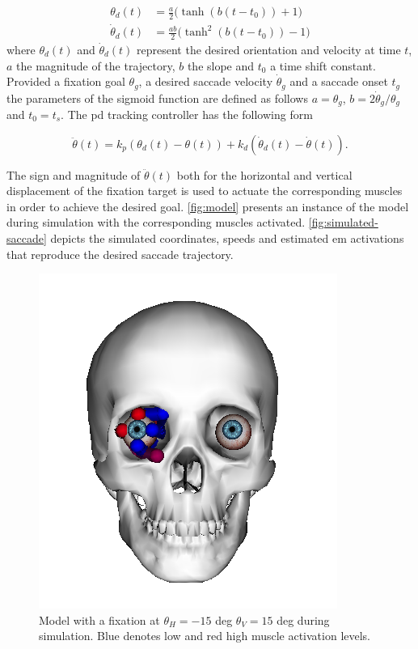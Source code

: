 \documentclass[11pt,a4paper,draft=false]{report}
\begin{document}
\begin{equation}\label{equ:sigmoid}
  \begin{aligned}
    \theta_d(t) &= \frac{a}{2} \Big(\tanh(b (t - t_0)) + 1\Big) \\
    \dot{\theta}_d(t) &= \frac{a b}{2} \Big(\tanh^2(b (t - t_0)) - 1\Big)
  \end{aligned}
\end{equation}
% 
where $\theta_d(t)$ and $\dot{\theta}_d(t)$ represent the desired orientation
and velocity at time $t$, $a$ the magnitude of the trajectory, $b$ the slope and
$t_0$ a time shift constant. Provided a fixation goal $\theta_g$, a desired
saccade velocity $\dot{\theta}_g$ and a saccade onset $t_g$ the parameters of
the sigmoid function are defined as follows $a = \theta_g$,
$b = 2 \dot{\theta}_g / \theta_g$ and $t_0 = t_s$. The \gls{pd} tracking
controller has the following form

\begin{equation}\label{equ:pd-controller}
  \ddot{\theta}(t) = k_p (\theta_d(t) - \theta(t)) + k_d (\dot{\theta}_d(t) -
  \dot{\theta}(t)).
\end{equation}

The sign and magnitude of $\ddot{\theta}(t)$ both for the horizontal and
vertical displacement of the fixation target is used to actuate the
corresponding muscles in order to achieve the desired goal. \autoref{fig:model}
presents an instance of the model during simulation with the corresponding
muscles activated. \autoref{fig:simulated-saccade} depicts the simulated
coordinates, speeds and estimated \gls{em} activations that reproduce the
desired saccade trajectory.

\begin{figure}[ht]
  \centering
  \includegraphics[width=.6\textwidth]{model.png}
  \caption{Model with a fixation at $\theta_H = -15$ deg $\theta_V = 15$ deg
    during simulation. Blue denotes low and red high muscle activation
    levels.}\label{fig:model}
\end{figure}
\end{document}
